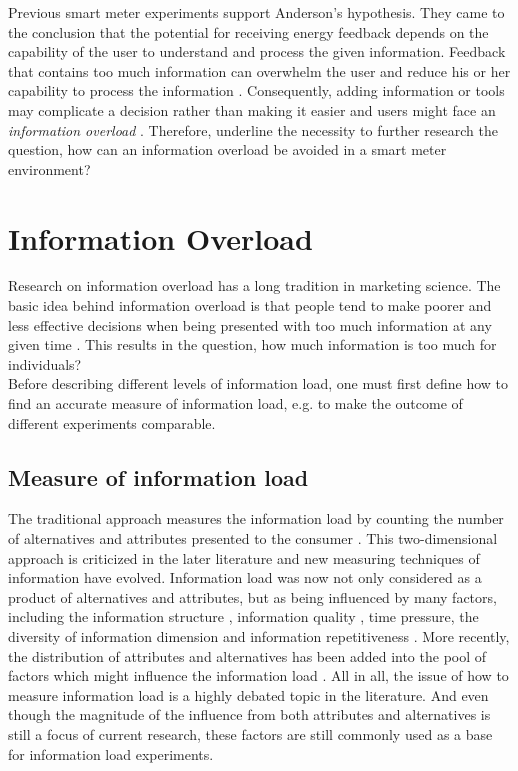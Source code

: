 Previous smart meter experiments support Anderson's hypothesis. They came to the conclusion that the potential for receiving energy feedback depends on the capability of the user to understand and process the given information.
Feedback that contains too much information can overwhelm the user and reduce his or her capability to process the information \citep{Henryson2000}. Consequently,  adding information or tools may complicate a decision rather than making it easier \citep{Darby2006} and users might face an \textit{information overload} \citep{Fischer2008}. Therefore, \cite{WillAnderson2009} underline the necessity to further research the question, how can an information overload be avoided in a smart meter environment?

\section{Information Overload}
\label{ch:Literature Review:sec:Information Overload}

Research on information overload has a long tradition in marketing science.
The basic idea behind information overload is that people tend to make poorer and less effective decisions when being presented with too much information at any given time \citep{Siegfried1965}. 
This results in the question, how much information is too much for individuals?\\
Before describing different levels of information load, one must first define how to find an accurate measure of information load, e.g. to make the outcome of different experiments comparable.
\subsection{Measure of information load}
The traditional approach measures the information load by counting the number of alternatives and attributes presented to the consumer \citep{Chen2009}. This two-dimensional approach is criticized in the later literature and new measuring techniques of information have evolved. Information load was now not only considered as a product of alternatives and attributes, but as being influenced by many factors, including the information structure \citep{Lurie2004}, information quality \citep{Keller1987}, time pressure, the diversity of information dimension \citep{Payne1982} and information repetitiveness \citep{Hwang1999}.
More recently, the distribution of attributes and alternatives has been added into the pool of factors which might influence the information load \citep{Lurie2004}. 
All in all, the issue of how to measure information load is a highly debated topic in the literature. And even though the magnitude of the influence from both attributes and alternatives is still a focus of current research, these factors are still commonly used as a base for information load experiments.

